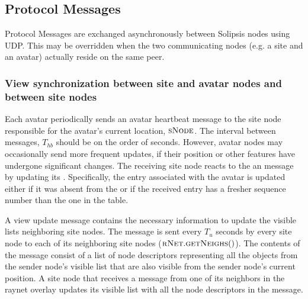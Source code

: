 \subsection{Protocol Messages}
Protocol Messages are exchanged asynchronously between Solipsis nodes
using UDP. This may be overridden when the two communicating nodes (e.g. a
site and an avatar) actually reside on the same peer. 


\subsubsection{View synchronization between site and avatar nodes and
  between site nodes}
\msgentry{\avhb}
\desc

Each avatar periodically sends an avatar heartbeat message to the site
node responsible for the avatar's current location, $\textsc{sNode}$. The
interval between messages, $T_{hb}$ should be on the order of
seconds. However, avatar nodes may occasionally send more frequent
updates, if their position or other features have undergone
significant changes. The receiving site node reacts to the an \avhb
message by updating its \vlist. Specifically, the entry associated
with the avatar is updated either if it was absent from the \vlist or
if the received entry has a fresher sequence number than the one in
the table.


\msgentry{\vupd}
\desc

A view update message contains the necessary information to update the
visible lists neighboring site nodes. The message is sent every $T_u$
seconds by every site node to each of its neighboring site nodes
($\textsc{rNet}.\textsc{getNeighs}()$). The contents of the message consist of a list of node
descriptors representing all the objects from the sender node's
visible list that are also visible from the sender node's current
position. A site node that receives a \vupd message from one of its
neighbors in the raynet overlay updates its visible list with all the
node descriptors in the message.

\msgentry{\snhb}
\desc

